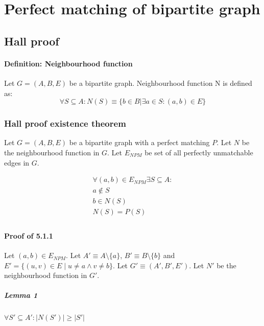 \chapter{Perfect matching of bipartite graph}

\section{Hall proof}

\subsubsection{Definition: Neighbourhood function}
Let $G = (A, B, E)$ be a bipartite graph. \newline
Neighbourhood function N is defined as:
\[
    \forall S \subseteq A: N(S) \equiv \{b \in B | \exists a \in S: (a, b) \in E \}
\]

\subsection{Hall proof existence theorem}

Let $G = (A, B, E)$ be a bipartite graph with a perfect matching $P$.
Let $N$ be the neighbourhood function in $G$.
Let $E_{NPM}$ be set of all perfectly unmatchable edges in $G$.

\begin{gather*}
    \forall (a, b) \in E_{NPM} \exists S \subseteq A: \\
    a \notin S \\
    b \in N(S) \\
    N(S) = P(S) \\
\end{gather*}

\subsubsection{Proof of 5.1.1}

Let $(a, b) \in E_{NPM}$. \newline
Let $A' \equiv A \setminus \{a\}$,
$B' \equiv B \setminus \{b\}$ and
$E' = \{ (u, v) \in E \mid u \neq a \land v \neq b \}$. \newline
Let $G' \equiv (A', B', E')$. \newline
Let $N'$ be the neighbourhood function in $G'$.

\paragraph{Lemma 1} $\forall S' \subseteq A': \left| N(S') \right| \geq \left| S' \right|$

